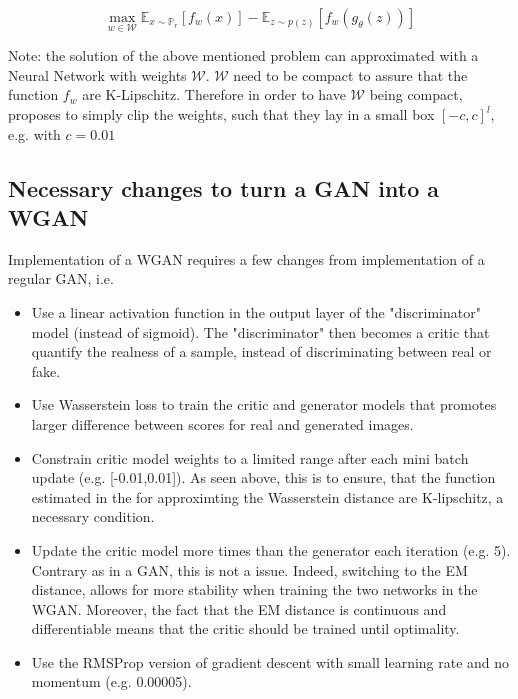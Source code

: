 \documentclass[11pt,a4paper,twoside]{report}
\begin{document}
\begin{equation}
    \max_{w \in \mathcal{W}}  \mathbb{E}_{x \sim \mathbb{P}_r}[f_w(x)] - \mathbb{E}_{z \sim p(z)}[f_w(g_{\theta}(z))]
\end{equation}

Note: the solution of the above mentioned problem can approximated with a Neural Network with weights $\mathcal{W}$. $\mathcal{W}$ need to be compact to assure that the function $f_w$ are K-Lipschitz. Therefore in order to have $\mathcal{W}$ being compact, \cite{arjovsky2017wasserstein} proposes to simply clip the weights, such that they lay in a small box $[-c, c]^l$, e.g. with $c = 0.01$

\subsection{Necessary changes to turn a GAN into a WGAN}

Implementation of a WGAN requires a few changes from implementation of a regular GAN, i.e. 

\begin{itemize}
    \item Use a linear activation function in the output layer of the "discriminator" model (instead of sigmoid). The "discriminator" then becomes a critic that quantify the realness of a sample, instead of discriminating between real or fake.
    \item Use Wasserstein loss to train the critic and generator models that promotes larger difference between scores for real and generated images. 
    \item Constrain critic model weights to a limited range after each mini batch update (e.g. [-0.01,0.01]). As seen above, this is to ensure, that the function estimated in the for approximting the Wasserstein distance are K-lipschitz, a necessary condition.
    \item Update the critic model more times than the generator each iteration (e.g. 5). Contrary as in a GAN, this is not a issue. Indeed, switching to the EM distance, allows for more stability when training the two networks in the WGAN. Moreover, the fact that the EM distance is continuous and differentiable means that the critic should be trained until optimality.
    \item Use the RMSProp version of gradient descent with small learning rate and no momentum (e.g. 0.00005).
    
\end{itemize}
\end{document}
